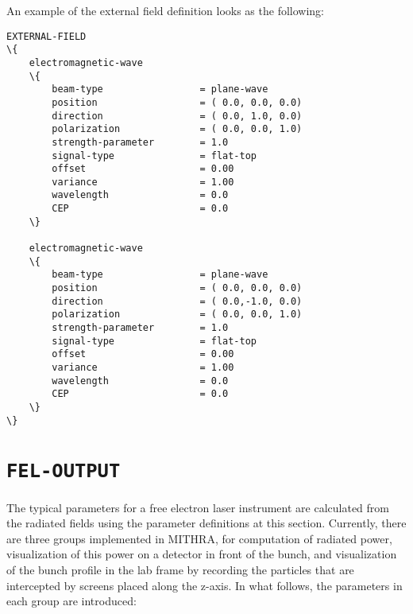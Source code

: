 An example of the external field definition looks as the following:
%
\begin{snugshade}
\begin{Verbatim}[fontsize=\small, tabsize=4, fontfamily=courier, fontseries=b, commandchars=\\\{\}, obeytabs]
EXTERNAL-FIELD
\{
	electromagnetic-wave
	\{
		beam-type				  = plane-wave
		position				  = ( 0.0, 0.0, 0.0)
    	direction				  = ( 0.0, 1.0, 0.0)
    	polarization			  = ( 0.0, 0.0, 1.0)
    	strength-parameter		  = 1.0
    	signal-type				  = flat-top
    	offset					  = 0.00
    	variance				  = 1.00
    	wavelength				  = 0.0
    	CEP						  = 0.0
	\}
	
	electromagnetic-wave
	\{
		beam-type				  = plane-wave
		position				  = ( 0.0, 0.0, 0.0)
		direction				  = ( 0.0,-1.0, 0.0)
		polarization			  = ( 0.0, 0.0, 1.0)
		strength-parameter		  = 1.0
		signal-type				  = flat-top
		offset					  = 0.00
		variance				  = 1.00
		wavelength				  = 0.0
		CEP						  = 0.0
	\}
\}
\end{Verbatim}
\end{snugshade}
%

\section{\texttt{FEL-OUTPUT}}

The typical parameters for a free electron laser instrument are calculated from the radiated fields using the parameter definitions at this section.
%
Currently, there are three groups implemented in MITHRA, for computation of radiated power, visualization of this power on a detector in front of the bunch, and visualization of the bunch profile in the lab frame by recording the particles that are intercepted by screens placed along the z-axis.
%
In what follows, the parameters in each group are introduced:

